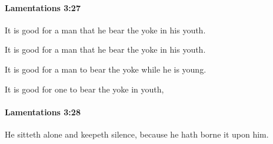 		\paragraph{Lamentations 3:27} %
			\label{LAMENTATIONS-3-27}

			It is good for a man that he bear the yoke in his youth.

			\begin{versebox}
					\item[BHS] 
					\item[LXX] 
					\item[ASV] It is good for a man that he bear the yoke in his youth.
					\item[NIV] It is good for a man to bear the yoke while he is young.
					\item[NRSV] It is good for one to bear the yoke in youth,
			\end{versebox}

		\paragraph{Lamentations 3:28} %
			\label{LAMENTATIONS-3-28}

			He sitteth alone and keepeth silence, because he hath borne it upon him.

